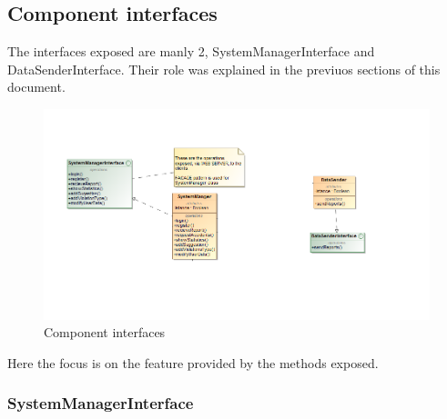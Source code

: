 \subsection{Component interfaces}

The interfaces exposed are manly 2, SystemManagerInterface and DataSenderInterface. Their role was explained in the previuos sections of this document.

\begin{figure}[H]
	\centering
	\includegraphics[width=1.12\linewidth]{Images/ComponentInterfaces.png}
	\caption{Component interfaces}
\end{figure}


Here the focus is on the feature provided by the methods exposed.

\subsubsection{SystemManagerInterface}

